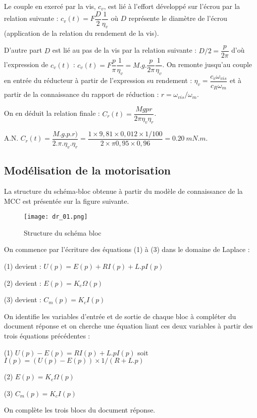 \ifprof
\begin{corrige}%
Le couple en exercé par la vis, $c_v$, est lié à l’effort développé sur l’écrou par la relation suivante : $c_v (t)=F\dfrac{D}{2}\dfrac{1}{\eta_v}$ où $D$ représente le diamètre de l’écrou (application de la relation du rendement de la vis). 

D’autre part $D$ est lié au pas de la vis par la relation suivante : $D/2=\dfrac{p}{2\pi}$ 
d’où l’expression de $c_v(t)$ : $c_v (t)=F \dfrac{p}{\pi}\dfrac{1}{\eta_v}=M.g.\dfrac{p}{2\pi}\dfrac{1}{\eta_v}$.
On remonte jusqu’au couple en entrée du réducteur à partir de l’expression su rendement : $\eta_v= \dfrac{c_v \omega_{vis}}{c_R \omega_m}$ et à partir de la connaissance du rapport de réduction : $r=\omega_{vis}/\omega_m$.
 
On en déduit la relation finale : $C_r (t)=\dfrac{Mgpr}{2\pi\eta_v\eta_r}$.

A.N. $C_r (t)=\dfrac{M.g.p.r)}{2.\pi.\eta_v.\eta_r}=\dfrac{1 \times  9,81 \times  0,012\times  1/100}{2 \times  \pi 0,95\times 0,96}=\SI{0,20}{mN.m}$.

\end{corrige}
\else
\fi

\subsection*{Modélisation de la motorisation}
\ifprof
\else
La structure du schéma-bloc obtenue à partir du modèle de connaissance de la MCC est présentée sur la figure suivante.

\begin{figure}[!h]
\centering
\texttt{[image: dr\_01.png]}
\caption{Structure du schéma bloc \label{dr_01}}
\end{figure}
\fi

\ifprof
\begin{corrige}%
On commence par l’écriture des équations (1) à (3) dans le domaine de Laplace :

(1) devient : $U(p)=E(p)+R I(p)+L.p I(p)$

(2) devient : $E(p)=K_e \Omega(p)$

(3) devient : $C_m (p)=K_c I(p)$

On identifie les variables d’entrée et de sortie de chaque bloc à compléter du document réponse et on cherche une équation liant ces deux variables à partir des trois équations précédentes :

(1) $U(p)-E(p)=RI(p)+L.pI(p)$ soit $I(p)=(U(p)-E(p))\times 1/(R+L.p)$

(2) $E(p)=K_e \Omega(p)$ 

(3) $C_m (p)=K_c I(p)$

On complète les trois blocs du document réponse.

\end{corrige}
\else
\fi

